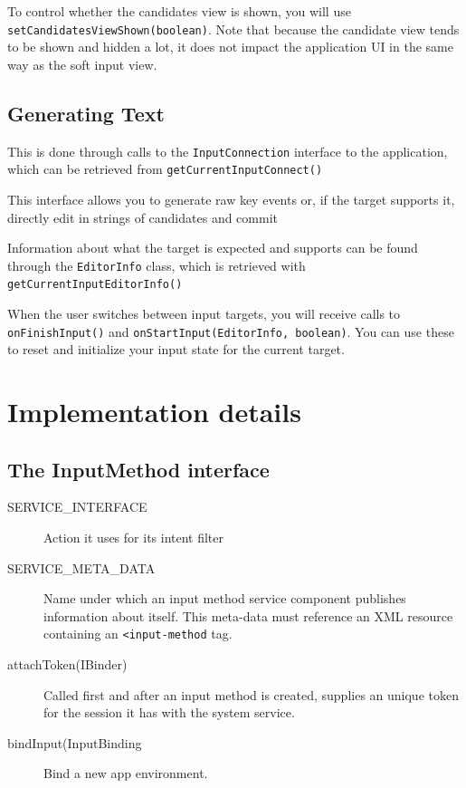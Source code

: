 \documentclass[11pt, a4paper]{book}
\begin{document}
To control whether the candidates view is shown, you will use
\verb|setCandidatesViewShown(boolean)|. Note that because the candidate view
tends to be shown and hidden a lot, it does not impact the application UI in the
same way as the soft input view.

\subsection{Generating Text}
This is done through calls to the \verb|InputConnection| interface to the
application, which can be retrieved from \verb|getCurrentInputConnect()|

This interface allows you to generate raw key events or, if the target supports
it, directly edit in strings of candidates and commit

Information about what the target is expected and supports can be found through
the \verb|EditorInfo| class, which is retrieved with
\verb|getCurrentInputEditorInfo()|

When the user switches between input targets, you will receive calls to
\verb|onFinishInput()| and \verb|onStartInput(EditorInfo, boolean)|. You can use
these to reset and initialize your input state for the current target.

\section{Implementation details}
\subsection{The InputMethod interface}
\begin{description}
    \item[SERVICE\_INTERFACE] Action it uses for its intent filter
    \item[SERVICE\_META\_DATA] Name under which an input method service
        component publishes information about itself. This meta-data must
        reference an XML resource containing an \verb|<input-method| tag.
    \item[attachToken(IBinder)]Called first and after an input method is
        created, supplies an unique token for the session it has with the system
        service.
    \item[bindInput(InputBinding] Bind a new app environment.
\end{description}
\end{document}
